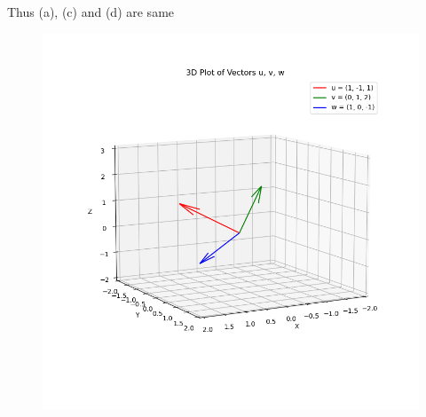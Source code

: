 \documentclass[journal]{IEEEtran}
\begin{document}
Thus (a), (c) and (d) are same

\begin{figure}
    \centering
    \includegraphics[width=1\linewidth]{figs/plot5.png}
    \caption{}
    \label{fig:placeholder}
\end{figure}
\end{document}
